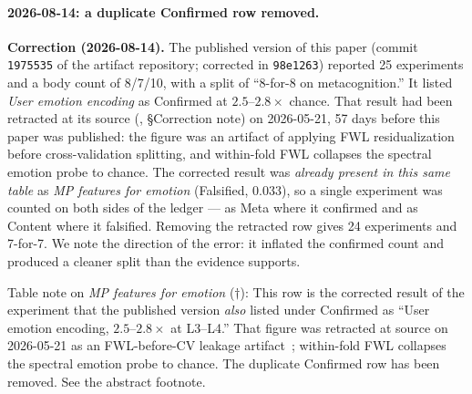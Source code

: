 \documentclass[11pt,a4paper]{article}
\begin{document}
\paragraph{2026-08-14: a duplicate Confirmed row removed.}
\textbf{Correction (2026-08-14).} The published
version of this paper (commit \texttt{1975535} of the artifact repository;
corrected in \texttt{98e1263}) reported 25 experiments and a body count of
8/7/10, with a split of ``8-for-8 on metacognition.'' It listed
\emph{User emotion encoding} as Confirmed at $2.5$--$2.8\times$
chance. That result had been retracted at its source
(\citealt{lyra2026usermodel}, \S Correction note) on 2026-05-21, 57 days
before this paper was published: the figure was an artifact of applying
FWL residualization before cross-validation splitting, and within-fold
FWL collapses the spectral emotion probe to chance. The corrected
result was \emph{already present in this same table} as \emph{MP
features for emotion} (Falsified, $0.033$), so a single experiment was
counted on both sides of the ledger --- as Meta where it confirmed and
as Content where it falsified. Removing the retracted row gives 24
experiments and 7-for-7. We note the direction of the error: it
inflated the confirmed count and produced a cleaner split than the
evidence supports.

Table note on \emph{MP features for emotion} ($\dagger$): This row is the corrected result of the experiment that the
published version \emph{also} listed under Confirmed as ``User emotion
encoding, $2.5$--$2.8\times$ at L3--L4.'' That figure was retracted at
source on 2026-05-21 as an FWL-before-CV leakage
artifact~\citep{lyra2026usermodel}; within-fold
FWL collapses the spectral emotion probe to chance. The duplicate
Confirmed row has been removed. See the abstract footnote.
\end{document}

